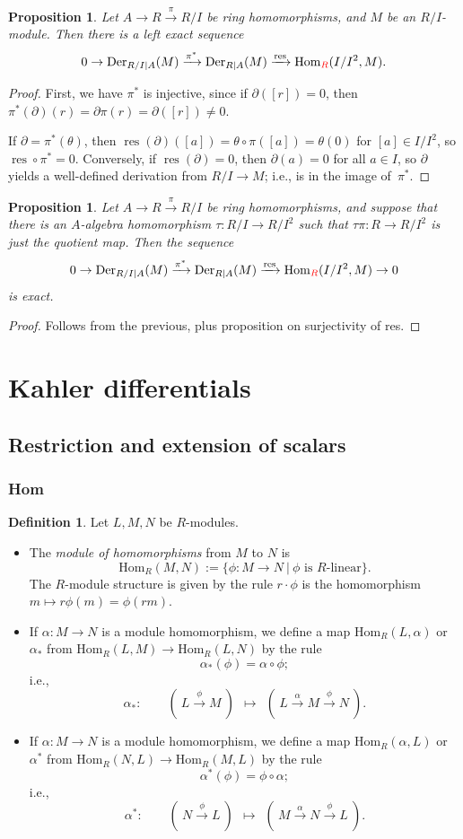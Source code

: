 \documentclass{amsart}[12pt]
\def\Der{\operatorname{Der}}
\newcommand{\Hom}{\mathrm{Hom}}
\numberwithin{equation}{section}
\theoremstyle{plain} %
\newtheorem{prop}[equation]{Proposition}
\theoremstyle{definition}
\newtheorem{defn}[equation]{Definition}
\theoremstyle{remark}
\renewcommand{\sec}[1]{\section{#1}}
\newcommand{\ssec}[1]{\subsection{#1}}
\newcommand{\sssec}[1]{\subsubsection{#1}}
\newcommand{\xra}[1]{\xrightarrow{#1}}
\def\res{\operatorname{res}}
\newcommand{\red}[1]{{\color{red}#1}}
\begin{document}
\begin{prop} Let $A\to R  \xra{\pi} R/I$ be ring homomorphisms, and $M$ be an $R/I$-module. Then there is a left exact sequence
\[ 0 \to \Der_{R/I|A}(M) \xra{\pi^*} \Der_{R|A}(M) \xra{\res} \Hom_{\red{R}}(I/I^2,M). \]
\end{prop}
\begin{proof}
First, we have $\pi^*$ is injective, since if $\partial([r])=0$, then $\pi^*(\partial)(r) = \partial \pi(r) = \partial([r])\neq 0$. 

If $\partial=\pi^*(\theta)$, then $\res( \partial) ([a]) =\theta \circ \pi([a]) = \theta (0)$ for $[a]\in I/I^2$, so $\res\circ\pi^*=0$. Conversely, if $\res(\partial)=0$, then $\partial(a)=0$ for all $a\in I$, so $\partial$ yields a well-defined derivation from $R/I\to M$; i.e., is in the image of~$\pi^*$.
\end{proof}

\begin{prop} Let $A\to R  \xra{\pi} R/I$ be ring homomorphisms, and suppose that there is an $A$-algebra homomorphism $\tau:R/I \to R/I^2$ such that $\tau\pi: R\to R/I^2$ is just the quotient map. Then the sequence
\[ 0 \to \Der_{R/I|A}(M) \xra{\pi^*} \Der_{R|A}(M) \xra{\res} \Hom_{\red{R}}(I/I^2,M) \to 0 \]
is exact.
\end{prop}
\begin{proof}
Follows from the previous, plus proposition on surjectivity of res.
\end{proof}


\sec{Kahler differentials}

\ssec{Restriction and extension of scalars}

\sssec{Hom}


\begin{defn} Let $L,M,N$ be $R$-modules.
	\begin{itemize}
		\item The \emph{module of homomorphisms}\index{$\Hom_R(M,N)$} from $M$ to $N$ is 
		\[ \Hom_R(M,N) := \{ \phi:M \to N \ | \ \phi\text{ is $R$-linear}\}.\]
		The $R$-module structure is given by the rule $r \cdot \phi$ is the homomorphism $m \mapsto r \phi(m) = \phi(rm)$.
		\item If $\alpha: M\to N$ is a module homomorphism, we define a map $\Hom_R(L,\alpha)$ or $\alpha_*$\index{$\Hom_R(L,\alpha)$}\index{$\alpha_*$} from $\Hom_R(L,M)\to \Hom_R(L,N)$ by the rule
		\[ \alpha_*{(\phi)} =  \alpha \circ \phi ;\]
		i.e.,
		\[ \alpha_* : \qquad (\ L\xrightarrow{\phi} M \ ) \ \ \mapsto \ \ (\ L \xrightarrow{\alpha }M\xrightarrow{\phi} N \ ).   \]
			\item If $\alpha: M\to N$ is a module homomorphism, we define a map $\Hom_R(\alpha,L)$ or $\alpha^*$\index{$\Hom_R(\alpha,L)$}\index{$\alpha^*$} from $\Hom_R(N,L)\to \Hom_R(M,L)$ by the rule
		\[ \alpha^*{(\phi)} = \phi \circ \alpha;\]
		i.e.,
		\[ \alpha^* : \qquad (\ N\xrightarrow{\phi} L \ ) \ \ \mapsto \ \ (\ M \xrightarrow{\alpha }N\xrightarrow{\phi} L \ ).   \]
	\end{itemize}
\end{defn}
\end{document}
